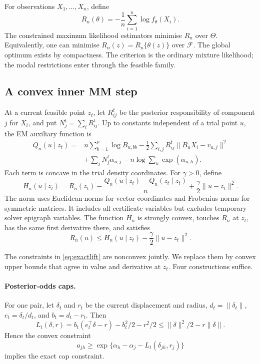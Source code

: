 \documentclass[12pt,a4paper]{article}
\theoremstyle{remark}
\begin{document}
For observations $X_1,\ldots,X_n$, define
\begin{equation}\label{eq:empiricalrisk}
 R_n(\theta)=-\frac1n\sum_{i=1}^n\log f_\theta(X_i).
\end{equation}
The constrained maximum likelihood estimators minimise $R_n$ over $\Theta$. Equivalently, one can minimise $R_n(z)=R_n\{\theta(z)\}$ over $\mathcal F$. The global optimum exists by compactness. The criterion is the ordinary mixture likelihood; the modal restrictions enter through the feasible family.

\subsection{A convex inner MM step}

At a current feasible point $z_t$, let $R_{ij}^t$ be the posterior responsibility of component $j$ for $X_i$, and put $N_j^t=\sum_iR_{ij}^t$. Up to constants independent of a trial point $u$, the EM auxiliary function is
\begin{equation}\label{eq:Q}
\begin{aligned}
 Q_n(u\mid z_t)
 ={}&n\sum_{b=1}^p\log B_{u,bb}
 -\frac12\sum_{i,j}R_{ij}^t\|B_uX_i-v_{u,j}\|^2\\
 &+\sum_jN_j^t\alpha_{u,j}
       -n\log\sum_h\exp(\alpha_{u,h}).
\end{aligned}
\end{equation}
Each term is concave in the trial density coordinates. For $\gamma>0$, define
\begin{equation}\label{eq:H}
 H_n(u\mid z_t)=R_n(z_t)
 -\frac{Q_n(u\mid z_t)-Q_n(z_t\mid z_t)}n
 +\frac\gamma2\|u-z_t\|^2.
\end{equation}
The norm uses Euclidean norms for vector coordinates and Frobenius norms for symmetric matrices. It includes all certificate variables but excludes temporary solver epigraph variables. The function $H_n$ is strongly convex, touches $R_n$ at $z_t$, has the same first derivative there, and satisfies
\begin{equation}\label{eq:EMbound}
 R_n(u)\le H_n(u\mid z_t)-\frac\gamma2\|u-z_t\|^2.
\end{equation}

The constraints in \eqref{eq:exactlift} are nonconvex jointly. We replace them by convex upper bounds that agree in value and derivative at $z_t$. Four constructions suffice.

\paragraph{Posterior-odds caps.}
For one pair, let $\delta_t$ and $r_t$ be the current displacement and radius, $d_t=\|\delta_t\|$, $e_t=\delta_t/d_t$, and $b_t=d_t-r_t$. Then
\[
 L_t(\delta,r)=b_t(e_t^\top\delta-r)-b_t^2/2-r^2/2
 \le \|\delta\|^2/2-r\|\delta\|.
\]
Hence the convex constraint
\begin{equation}\label{eq:innerodds}
 a_{jh}\ge\exp\{\alpha_h-\alpha_j-L_t(\delta_{jh},r_j)\}
\end{equation}
implies the exact cap constraint.
\end{document}
